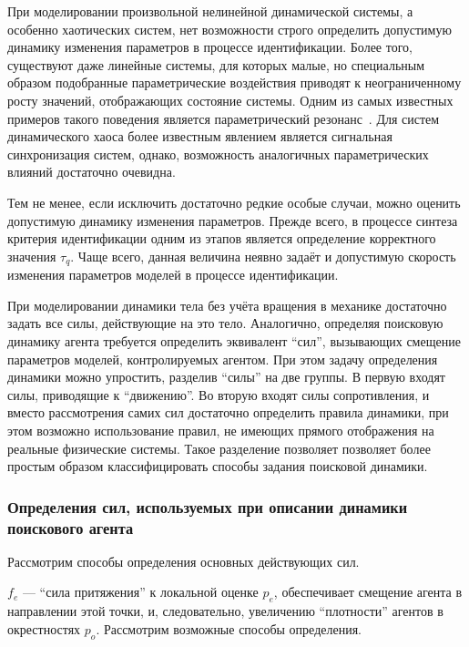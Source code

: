 При моделировании произвольной нелинейной динамической системы,
а особенно хаотических систем, нет возможности строго
определить допустимую динамику изменения параметров
в процессе идентификации. Более того, существуют
даже линейные системы, для которых малые, но специальным
образом подобранные параметрические воздействия
приводят к неограниченному росту значений, отображающих
состояние системы. Одним из самых известных примеров
такого поведения является параметрический резонанс~.
Для систем динамического хаоса более известным явлением является
сигнальная синхронизация систем, однако,
возможность аналогичных параметрических влияний достаточно очевидна.

Тем не менее, если исключить достаточно редкие особые случаи,
можно оценить допустимую динамику изменения параметров.
Прежде всего, в процессе синтеза критерия идентификации
одним из этапов является определение корректного значения $\tau_q$.
Чаще всего, данная величина неявно задаёт и допустимую
скорость изменения параметров моделей в процессе идентификации.

При моделировании динамики тела без учёта вращения в механике достаточно
задать все силы, действующие на это тело.
Аналогично, определяя  поисковую динамику агента
требуется определить эквивалент ``сил'',
вызывающих смещение параметров моделей, контролируемых агентом.
При этом задачу определения динамики можно упростить,
разделив ``силы'' на две группы. В первую входят
силы, приводящие к ``движению''. Во вторую входят силы сопротивления,
и вместо рассмотрения самих сил достаточно
определить правила динамики, при этом возможно
использование правил, не имеющих прямого отображения
на реальные физические системы.
Такое разделение позволяет позволяет более простым образом классифицировать
способы задания поисковой динамики.


\subsubsection{Определения сил, используемых при описании динамики поискового агента}  %

Рассмотрим способы определения основных действующих сил.

$f_e$ --- ``сила притяжения'' к локальной
оценке $p_e$, обеспечивает смещение агента в направлении этой точки,
и, следовательно, увеличению ``плотности'' агентов в окрестностях $p_o$.
Рассмотрим возможные способы определения.

